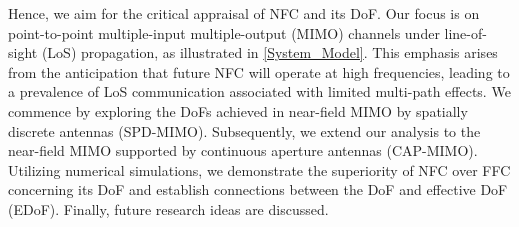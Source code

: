 \documentclass[journal]{IEEEtran}
\theoremstyle{definition}
\begin{document}
Hence, we aim for the critical appraisal of NFC and its DoF. Our focus is on point-to-point multiple-input multiple-output (MIMO) channels under line-of-sight (LoS) propagation, as illustrated in {\figurename} {\ref{System_Model}}. This emphasis arises from the anticipation that future NFC will operate at high frequencies, leading to a prevalence of LoS communication associated with limited multi-path effects. We commence by exploring the DoFs achieved in near-field MIMO by spatially discrete antennas (SPD-MIMO). Subsequently, we extend our analysis to the near-field MIMO supported by continuous aperture antennas (CAP-MIMO). Utilizing numerical simulations, we demonstrate the superiority of NFC over FFC concerning its DoF and establish connections between the DoF and effective DoF (EDoF). Finally, future research ideas are discussed.
%


%

%
\end{document}
